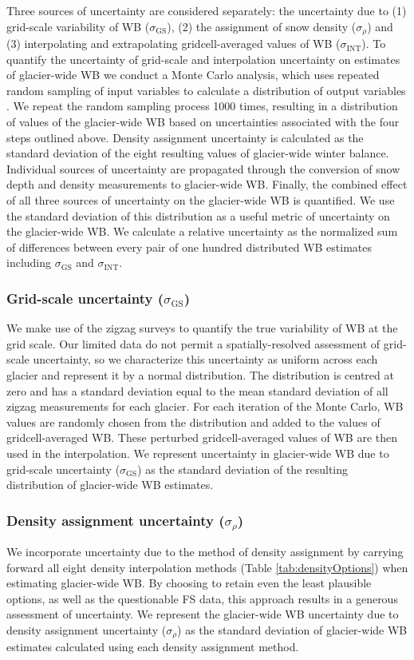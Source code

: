 \documentclass[twocolumn, letterpaper]{igs}
\begin{document}
Three sources of uncertainty are considered separately: the uncertainty due to (1) grid-scale variability of WB ($\sigma_{\mathrm{GS}}$), (2) the assignment of snow density ($\sigma_{\rho}$) and (3) interpolating and extrapolating gridcell-averaged values of WB ($\sigma_{\mathrm{INT}}$). To quantify the uncertainty of grid-scale and interpolation uncertainty on estimates of glacier-wide WB we conduct a Monte Carlo analysis, which uses repeated random sampling of input variables to calculate a distribution of output variables \citep{Metropolis1949}. We repeat the random sampling process 1000 times, resulting in a distribution of values of the glacier-wide WB based on uncertainties associated with the four steps outlined above. Density assignment uncertainty is calculated as the standard deviation of the eight resulting values of glacier-wide winter balance. 
Individual sources of uncertainty are propagated through the conversion of snow depth and density measurements to glacier-wide WB. Finally, the combined effect of all three sources of uncertainty on the glacier-wide WB is quantified. We use the standard deviation of this distribution as a useful metric of uncertainty on the glacier-wide WB. We calculate a relative uncertainty as the normalized sum of differences between every pair of one hundred distributed WB estimates including $\sigma_{\mathrm{GS}}$ and $\sigma_{\mathrm{INT}}$.

	\subsubsection{Grid-scale uncertainty ($\sigma_{\mathrm{GS}}$)}
We make use of the zigzag surveys to quantify the true variability of WB at the grid scale. Our limited data do not permit a spatially-resolved assessment of grid-scale uncertainty, so we characterize this uncertainty as uniform across each glacier and represent it by a normal distribution. The distribution is centred at zero and has a standard deviation equal to the mean standard deviation of all zigzag measurements for each glacier. For each iteration of the Monte Carlo, WB values are randomly chosen from the distribution and added to the values of gridcell-averaged WB. These perturbed gridcell-averaged values of WB are then used in the interpolation. We represent uncertainty in glacier-wide WB due to grid-scale uncertainty ($\sigma_{\mathrm{GS}}$) as the standard deviation of the resulting distribution of glacier-wide WB estimates.  

	\subsubsection{Density assignment uncertainty ($\sigma_{\rho}$)}
We incorporate uncertainty due to the method of density assignment by carrying forward all eight density interpolation methods (Table \ref{tab:densityOptions}) when estimating glacier-wide WB. By choosing to retain even the least plausible options, as well as the questionable FS data, this approach results in a generous assessment of uncertainty. We represent the glacier-wide WB uncertainty due to density assignment uncertainty ($\sigma_{\rho}$) as the standard deviation of glacier-wide WB estimates calculated using each density assignment method.
\end{document}

